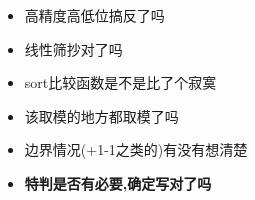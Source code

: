 \noindent
\begin{itemize}
    \item 高精度高低位搞反了吗
    \item 线性筛抄对了吗
    \item sort比较函数是不是比了个寂寞
    \item 该取模的地方都取模了吗
    \item 边界情况(+1-1之类的)有没有想清楚
    \item \bfseries{特判是否有必要,确定写对了吗}
\end{itemize}
